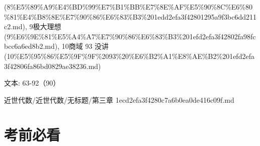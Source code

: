 \begin{note}[第三章]
(8\%E5\%89\%A9\%E4\%BD\%99\%E7\%B1\%BB\%E7\%8E\%AF\%E5\%90\%8C\%E6\%80\%81\%E4\%B8\%8E\%E7\%90\%86\%E6\%83\%B3\%201edd2efa3f42801295a9f3bc6dd211c2.md), 9极大理想 (9\%E6\%9E\%81\%E5\%A4\%A7\%E7\%90\%86\%E6\%83\%B3\%201efd2efa3f42802fa98fcbcc6a6ed8b2.md), 10商域 93 没讲 (10\%E5\%95\%86\%E5\%9F\%9F\%2093\%20\%E6\%B2\%A1\%E8\%AE\%B2\%201efd2efa3f42806fa86bd0829ae38236.md)

文本: 63-92（90）

\end{note}

\begin{note}[来源路径]

近世代数/近世代数/无标题/第三章 1ecd2efa3f4280c7a6b0ea0de416c09f.md

\end{note}

\section*{考前必看}

